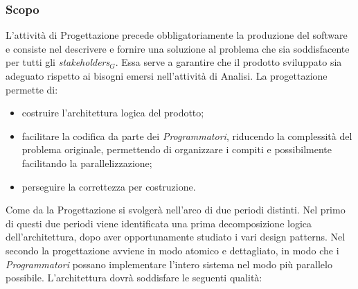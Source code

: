 \subsubsection{Scopo}
L'attività di Progettazione precede obbligatoriamente la produzione del software e consiste nel descrivere e fornire una soluzione al problema che sia soddisfacente per tutti gli \textit{stakeholders$_{G}$}. Essa serve a garantire che il prodotto sviluppato sia adeguato rispetto ai bisogni emersi nell'attività di Analisi. 
La progettazione permette di:
\begin{itemize}
	\item costruire l'architettura logica del prodotto;
	\item facilitare la codifica da parte dei \textit{Programmatori}, riducendo la complessità del problema originale, permettendo di organizzare i compiti e possibilmente facilitando la parallelizzazione;
	\item perseguire la correttezza per costruzione.
\end{itemize}
Come da \pianodiprogetto la Progettazione si svolgerà nell'arco di due periodi distinti. 
Nel primo di questi due periodi viene identificata una prima decomposizione logica dell'architettura, dopo aver opportunamente studiato i vari design patterns. Nel secondo la progettazione avviene in modo atomico e dettagliato, in modo che i \textit{Programmatori} possano implementare l'intero sistema nel modo più parallelo possibile. 
L'architettura dovrà soddisfare le seguenti qualità: 
